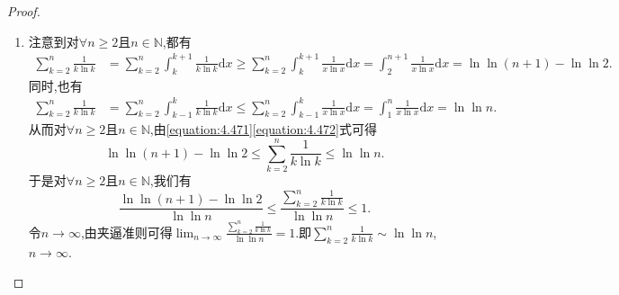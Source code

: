 \documentclass[../../main.tex]{subfiles}
\begin{document}
\begin{proof}
\begin{enumerate}
\item 注意到对\(\forall n\geqslant 2\)且\(n\in\mathbb{N}\),都有
\begin{align}\label{equation:4.471}
\sum_{k = 2}^n\frac{1}{k\ln k}&=\sum_{k = 2}^n\int_{k}^{k + 1}\frac{1}{k\ln k}\mathrm{d}x
\geqslant\sum_{k = 2}^n\int_{k}^{k + 1}\frac{1}{x\ln x}\mathrm{d}x
=\int_{2}^{n + 1}\frac{1}{x\ln x}\mathrm{d}x
=\ln\ln(n + 1) - \ln\ln 2.
\end{align}
同时,也有
\begin{align}\label{equation:4.472}
\sum_{k = 2}^n\frac{1}{k\ln k}&=\sum_{k = 2}^n\int_{k - 1}^{k}\frac{1}{k\ln k}\mathrm{d}x
\leqslant\sum_{k = 2}^n\int_{k - 1}^{k}\frac{1}{x\ln x}\mathrm{d}x
=\int_{1}^{n}\frac{1}{x\ln x}\mathrm{d}x
=\ln\ln n.
\end{align}
从而对\(\forall n\geqslant 2\)且\(n\in\mathbb{N}\),由\eqref{equation:4.471}\eqref{equation:4.472}式可得
\[
\ln\ln(n + 1) - \ln\ln 2\leqslant\sum_{k = 2}^n\frac{1}{k\ln k}\leqslant\ln\ln n.
\]
于是对\(\forall n\geqslant 2\)且\(n\in\mathbb{N}\),我们有
\[
\frac{\ln\ln(n + 1) - \ln\ln 2}{\ln\ln n}\leqslant\frac{\sum\limits_{k = 2}^n\frac{1}{k\ln k}}{\ln\ln n}\leqslant 1.
\]
令\(n\rightarrow\infty\),由夹逼准则可得\(\lim_{n\rightarrow\infty}\frac{\sum\limits_{k = 2}^n\frac{1}{k\ln k}}{\ln\ln n}=1\).即\(\sum_{k = 2}^n\frac{1}{k\ln k}\sim\ln\ln n\),\(n\rightarrow\infty\).
\end{enumerate}
\end{proof}
\end{document}
